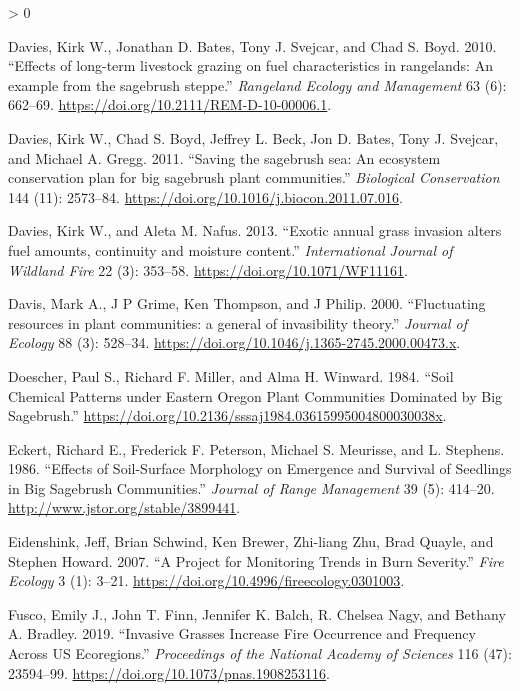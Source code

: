 \documentclass[
  12pt,
]{article}
\newlength{\cslhangindent}
\newenvironment{CSLReferences}[2] %
 {%
  \setlength{\parindent}{0pt}
  \ifodd #1 \everypar{\setlength{\hangindent}{\cslhangindent}}\ignorespaces\fi
  \ifnum #2 > 0
  \setlength{\parskip}{#2\baselineskip}
  \fi
 }%
 {}
\begin{document}
\begin{CSLReferences}{1}{0}
\leavevmode\hypertarget{ref-Davies2010}{}%
Davies, Kirk W., Jonathan D. Bates, Tony J. Svejcar, and Chad S. Boyd.
2010. {``{Effects of long-term livestock grazing on fuel characteristics
in rangelands: An example from the sagebrush steppe}.''} \emph{Rangeland
Ecology and Management} 63 (6): 662--69.
\url{https://doi.org/10.2111/REM-D-10-00006.1}.

\leavevmode\hypertarget{ref-Davies2011}{}%
Davies, Kirk W., Chad S. Boyd, Jeffrey L. Beck, Jon D. Bates, Tony J.
Svejcar, and Michael A. Gregg. 2011. {``{Saving the sagebrush sea: An
ecosystem conservation plan for big sagebrush plant communities}.''}
\emph{Biological Conservation} 144 (11): 2573--84.
\url{https://doi.org/10.1016/j.biocon.2011.07.016}.

\leavevmode\hypertarget{ref-Davies2013}{}%
Davies, Kirk W., and Aleta M. Nafus. 2013. {``{Exotic annual grass
invasion alters fuel amounts, continuity and moisture content}.''}
\emph{International Journal of Wildland Fire} 22 (3): 353--58.
\url{https://doi.org/10.1071/WF11161}.

\leavevmode\hypertarget{ref-Davis2000}{}%
Davis, Mark A., J P Grime, Ken Thompson, and J Philip. 2000.
{``{Fluctuating resources in plant communities: a general of
invasibility theory}.''} \emph{Journal of Ecology} 88 (3): 528--34.
\url{https://doi.org/10.1046/j.1365-2745.2000.00473.x}.

\leavevmode\hypertarget{ref-Doescher1984}{}%
Doescher, Paul S., Richard F. Miller, and Alma H. Winward. 1984.
{``{Soil Chemical Patterns under Eastern Oregon Plant Communities
Dominated by Big Sagebrush}.''}
\url{https://doi.org/10.2136/sssaj1984.03615995004800030038x}.

\leavevmode\hypertarget{ref-Eckert1986}{}%
Eckert, Richard E., Frederick F. Peterson, Michael S. Meurisse, and L.
Stephens. 1986. {``{Effects of Soil-Surface Morphology on Emergence and
Survival of Seedlings in Big Sagebrush Communities}.''} \emph{Journal of
Range Management} 39 (5): 414--20.
\url{http://www.jstor.org/stable/3899441}.

\leavevmode\hypertarget{ref-Eidenshink2007}{}%
Eidenshink, Jeff, Brian Schwind, Ken Brewer, Zhi-liang Zhu, Brad Quayle,
and Stephen Howard. 2007. {``{A Project for Monitoring Trends in Burn
Severity}.''} \emph{Fire Ecology} 3 (1): 3--21.
\url{https://doi.org/10.4996/fireecology.0301003}.

\leavevmode\hypertarget{ref-Fusco2019}{}%
Fusco, Emily J., John T. Finn, Jennifer K. Balch, R. Chelsea Nagy, and
Bethany A. Bradley. 2019. {``Invasive Grasses Increase Fire Occurrence
and Frequency Across US Ecoregions.''} \emph{Proceedings of the National
Academy of Sciences} 116 (47): 23594--99.
\url{https://doi.org/10.1073/pnas.1908253116}.


\end{CSLReferences}
\end{document}
